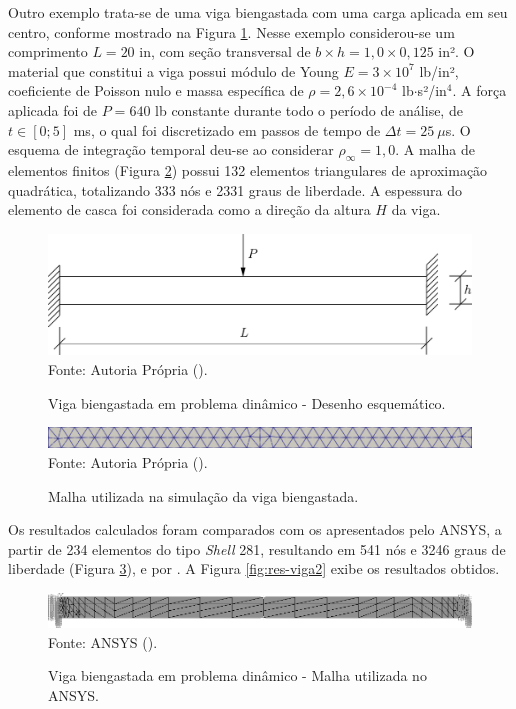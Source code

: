 Outro exemplo trata-se de uma viga biengastada com uma carga aplicada em seu centro, conforme mostrado na Figura \ref{fig:viga2}. Nesse exemplo considerou-se um comprimento $L=20$ in, com seção transversal de $b\times h=1,0\times0,125$ in². O material que constitui a viga possui módulo de Young $E=3\times10^{7}$ lb/in², coeficiente de Poisson nulo e massa específica de $\rho=2,6\times10^{-4}$ lb$\cdot$s²/in$^4$. A força aplicada foi de $P=640$ lb constante durante todo o período de análise, de $t\in[0;5]$ ms, o qual foi discretizado em passos de tempo de $\Delta t=25\ \mu$s. O esquema de integração temporal deu-se ao considerar $\rho_\infty=1,0$. A malha de elementos finitos (Figura \ref{fig:viga2-mesh}) possui 132 elementos triangulares de aproximação quadrática, totalizando 333 nós e 2331 graus de liberdade. A espessura do elemento de casca foi considerada como a direção da altura $H$ da viga.

\begin{figure}[h!]
    \centering
    \caption{Viga biengastada em problema dinâmico - Desenho esquemático.}
    \includegraphics[width=0.6\linewidth]{Figuras/vigas/viga2.pdf}
    \\Fonte: Autoria Própria (\the\year).
    \label{fig:viga2}
\end{figure}

\begin{figure}[h!]
    \centering
    \caption{Malha utilizada na simulação da viga biengastada.}
    \includegraphics[width=\linewidth]{Figuras/vigas/mesh2.png}
    \\Fonte: Autoria Própria (\the\year).
    \label{fig:viga2-mesh}
\end{figure}

Os resultados calculados foram comparados com os apresentados pelo ANSYS, a partir de 234 elementos do tipo \textit{Shell} 281, resultando em 541 nós e 3246 graus de liberdade (Figura \ref{fig:beamANSYS2}), e por \cite{mondkar1977ansa}. A Figura \ref{fig:res-viga2} exibe os resultados obtidos.

\begin{figure}[h!]
    \centering
    \caption{Viga biengastada em problema dinâmico - Malha utilizada no ANSYS.}
    \includegraphics[width=\linewidth]{Figuras/vigas/ANSYSmesh2.png}
    \\Fonte: ANSYS (\the\year).
    \label{fig:beamANSYS2}
\end{figure}

